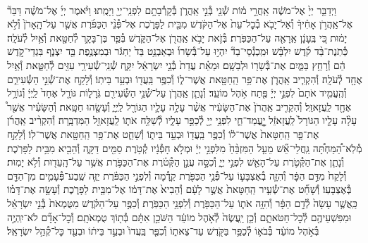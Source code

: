 \documentclass[twoside, openany, parskip=half, 11pt]{book}
\begin{document}
\begin{footnotesize}
\begin{multicols}{2}
\\
וַיְדַבֵּ֤ר יְיָ֙ אֶל־מֹשֶׁ֔ה אַֽחֲרֵ֣י מ֔וֹת שְׁ֯נֵ֖י בְּ֯נֵ֣י אַֽהֲרֹ֑ן בְּ֯קָרְ֯בָתָ֥ם לִפְנֵֽי־יְיָ֖ וַיָּמֻֽתוּ׃ וַיֹּ֨אמֶר יְיָ֜ אֶל־מֹשֶׁ֗ה דַּבֵּר֘ אֶל־אַֽהֲרֹ֣ן אָחִ֒יךָ֒ וְ֯אַל־יָבֹ֤א בְ֯כׇל־עֵת֙ אֶל־הַקֹּ֔דֶשׁ מִבֵּ֖ית לַפָּרֹ֑כֶת אֶל־פְּ֯נֵ֨י הַכַּפֹּ֜רֶת אֲשֶׁ֤ר עַל־הָֽאָרֹן֙ וְ֯לֹ֣א יָמ֔וּת כִּ֚י בֶּֽעָנָ֔ן אֵֽרָאֶ֖ה עַל־הַכַּפֹּֽרֶת׃ בְּ֯זֹ֛את יָבֹ֥א אַֽהֲרֹ֖ן אֶל־הַקֹּ֑דֶשׁ בְּ֯פַ֧ר בֶּן־בָּקָ֛ר לְ֯חַטָּ֖את וְ֯אַ֥יִל לְ֯עֹלָֽה׃ כְּ֯תֹֽנֶת־בַּ֨ד קֹ֜דֶשׁ יִלְבָּ֗שׁ וּמִֽכְנְ֯סֵי־בַד֘ יִהְי֣וּ עַל־בְּ֯שָׂרוֹ֒ וּבְאַבְנֵ֥ט בַּד֙ יַחְגֹּ֔ר וּבְמִצְנֶ֥פֶת בַּ֖ד יִצְנֹ֑ף בִּגְדֵי־קֹ֣דֶשׁ הֵ֔ם וְ֯רָחַ֥ץ בַּמַּ֛יִם אֶת־בְּ֯שָׂר֖וֹ וּלְבֵשָֽׁם׃ וּמֵאֵ֗ת עֲדַת֙ בְּ֯נֵ֣י יִשְׂרָאֵ֔ל יִקַּ֛ח שְׁ֯נֵֽי־שְׂ֯עִירֵ֥י עִזִּ֖ים לְ֯חַטָּ֑את וְ֯אַ֥יִל אֶחָ֖ד לְ֯עֹלָֽה׃ וְ֯הִקְרִ֧יב אַֽהֲרֹ֛ן אֶת־פַּ֥ר הַֽחַטָּ֖את אֲשֶׁר־ל֑וֹ וְ֯כִפֶּ֥ר בַּֽעֲד֖וֹ וּבְעַ֥ד בֵּיתֽוֹ׃  וְ֯לָקַ֖ח אֶת־שְׁ֯נֵ֣י הַשְּׂ֯עִירִ֑ם וְ֯הֶֽעֱמִ֤יד אֹתָם֙ לִפְנֵ֣י יְיָ֔ פֶּ֖תַח אֹ֥הֶל מוֹעֵֽד׃ וְ֯נָתַ֧ן אַֽהֲרֹ֛ן עַל־שְׁ֯נֵ֥י הַשְּׂ֯עִירִ֖ם גֹּֽרָל֑וֹת גּוֹרָ֤ל אֶחָד֙ לַֽיְיָ֔ וְ֯גוֹרָ֥ל אֶחָ֖ד לַֽעֲזָאזֵֽל׃ וְ֯הִקְרִ֤יב אַֽהֲרֹן֙ אֶת־הַשָּׂעִ֔יר אֲשֶׁ֨ר עָלָ֥ה עָלָ֛יו הַגּוֹרָ֖ל לַֽיְיָ֑ וְ֯עָשָׂ֖הוּ חַטָּֽאת׃ וְ֯הַשָּׂעִ֗יר אֲשֶׁ֖ר֩ עָלָ֨ה עָלָ֤יו הַגּוֹרָל֙ לַֽעֲזָאזֵ֔ל יׇׇׇׇׇׇׇׇׇׇׇׇׇׇׇׇׇׇׇׇֽעֳמַד־חַ֛י לִפְנֵ֥י יְיָ֖ לְ֯כַפֵּ֣ר עָלָ֑יו לְ֯שַׁלַּ֥ח אֹת֛וֹ לַֽעֲזָאזֵ֖ל הַמִּדְבָּֽרָה׃ וְ֯הִקְרִ֨יב אַֽהֲרֹ֜ן אֶת־פַּ֤ר הַֽחַטָּאת֙ אֲשֶׁר־ל֔וֹ וְ֯כִפֶּ֥ר בַּֽעֲד֖וֹ וּבְעַ֣ד בֵּית֑וֹ וְ֯שָׁחַ֛ט אֶת־פַּ֥ר הַֽחַטָּ֖את אֲשֶׁר־לֽוֹ׃  וְ֯לָקַ֣ח מְ֯לֹֽא־הַ֠מַּחְתָּ֠ה גַּֽחֲלֵי־אֵ֞שׁ מֵעַ֤ל הַמִּזְבֵּ֨חַ֙ מִלִּפְנֵ֣י יְיָ֔ וּמְלֹ֣א חָפְ֯נָ֔יו קְ֯טֹ֥רֶת סַמִּ֖ים דַּקָּ֑ה וְ֯הֵבִ֖יא מִבֵּ֥ית לַפָּרֹֽכֶת׃ וְ֯נָתַ֧ן אֶת־הַקְּ֯טֹ֛רֶת עַל־הָאֵ֖שׁ לִפְנֵ֣י יְיָ֑ וְ֯כִסָּ֣ה עֲנַ֣ן הַקְּ֯טֹ֗רֶת אֶת־הַכַּפֹּ֛רֶת אֲשֶׁ֥ר עַל־הָֽעֵד֖וּת וְ֯לֹ֥א יָמֽוּת׃ וְ֯לָקַח֙ מִדַּ֣ם הַפָּ֔ר וְ֯הִזָּ֧ה בְ֯אֶצְבָּע֛וֹ עַל־פְּ֯נֵ֥י הַכַּפֹּ֖רֶת קֵ֑דְ֯מָה וְ֯לִפְנֵ֣י הַכַּפֹּ֗רֶת יַזֶּ֧ה שֶֽׁבַע־פְּ֯עָמִ֛ים מִן־הַדָּ֖ם בְּ֯אֶצְבָּעֽוֹ׃ וְ֯שָׁחַ֞ט אֶת־שְׂ֯עִ֤יר הַֽחַטָּאת֙ אֲשֶׁ֣ר לָעָ֔ם וְ֯הֵבִיא֙ אֶת־דָּמ֔וֹ אֶל־מִבֵּ֖ית לַפָּרֹ֑כֶת וְ֯עָשָׂ֣ה אֶת־דָּמ֗וֹ כַּֽאֲשֶׁ֤ר עָשָׂה֙ לְ֯דַ֣ם הַפָּ֔ר וְ֯הִזָּ֥ה אֹת֛וֹ עַל־הַכַּפֹּ֖רֶת וְ֯לִפְנֵ֥י הַכַּפֹּֽרֶת׃ וְ֯כִפֶּ֣ר עַל־הַקֹּ֗דֶשׁ מִטֻּמְאֹת֙ בְּ֯נֵ֣י יִשְׂרָאֵ֔ל וּמִפִּשְׁעֵיהֶ֖ם לְ֯כׇל־חַטֹּאתָ֑ם וְ֯כֵ֤ן יַֽעֲשֶׂה֙ לְ֯אֹ֣הֶל מוֹעֵ֔ד הַשֹּׁכֵ֣ן אִתָּ֔ם בְּ֯ת֖וֹךְ טֻמְאֹתָֽם׃ וְ֯כׇל־אָדָ֞ם לֹא־יִֽהְיֶ֣ה בְּ֯אֹ֣הֶל מוֹעֵ֗ד בְּ֯בֹא֛וֹ לְ֯כַפֵּ֥ר בַּקֹּ֖דֶשׁ עַד־צֵאת֑וֹ וְ֯כִפֶּ֤ר בַּֽעֲדוֹ֙ וּבְעַ֣ד בֵּית֔וֹ וּבְעַ֖ד כׇּל־קְ֯הַ֥ל יִשְׂרָאֵֽל׃


\end{multicols}
\end{footnotesize}
\end{document}
